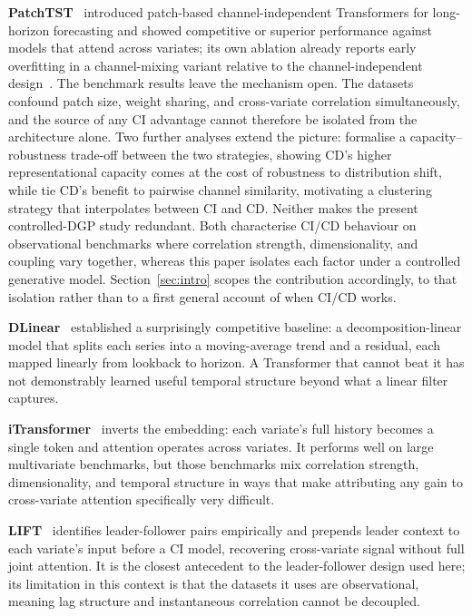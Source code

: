 \documentclass[10pt]{article} %
\begin{document}
    \textbf{PatchTST}~\citep{nie2023patchtst} introduced patch-based channel-independent Transformers for long-horizon
    forecasting and showed competitive or superior performance against models that attend across variates; its own
    ablation already reports early overfitting in a channel-mixing variant relative to the channel-independent
    design~\citep[App.~A.7.1]{nie2023patchtst}. The benchmark results leave the mechanism open. The datasets confound
    patch size, weight sharing, and cross-variate correlation simultaneously, and the source of any CI advantage cannot therefore
    be isolated from the architecture alone. Two further analyses extend the picture:
    \citet{han2023capacityrobustnesstradeoffrevisiting} formalise a capacity--robustness trade-off between the two
    strategies, showing CD's higher representational capacity comes at the cost of robustness to distribution shift,
    while \citet{chen2024similaritysuperioritychannelclustering} tie CD's benefit to pairwise channel similarity,
    motivating a clustering strategy that interpolates between CI and CD. Neither makes the present controlled-DGP
    study redundant. Both characterise CI/CD behaviour on observational benchmarks where correlation strength,
    dimensionality, and coupling vary together, whereas this paper isolates each factor under a controlled generative
    model. Section~\ref{sec:intro} scopes the contribution accordingly, to that isolation rather than to a first
    general account of when CI/CD works.

    \textbf{DLinear}~\citep{zeng2023transformerseffectivetimeseries} established a surprisingly competitive baseline: a
    decomposition-linear model that splits each series into a moving-average trend and a residual, each mapped linearly
    from lookback to horizon. A Transformer that cannot beat it has not demonstrably learned useful temporal structure
    beyond what a linear filter captures.

    \textbf{iTransformer}~\citep{liu2024itransformer} inverts the embedding: each variate's full history becomes a
    single token and attention operates across variates. It performs well on large multivariate benchmarks, but those
    benchmarks mix correlation strength, dimensionality, and temporal structure in ways that make attributing any gain
    to cross-variate attention specifically very difficult.

    \textbf{LIFT}~\citep{zhao2024rethinkingchanneldependence} identifies leader-follower pairs empirically and prepends
    leader context to each variate's input before a CI model, recovering cross-variate signal without full joint
    attention. It is the closest antecedent to the leader-follower design used here; its limitation in this context is
    that the datasets it uses are observational, meaning lag structure and instantaneous correlation cannot be decoupled.
\end{document}

